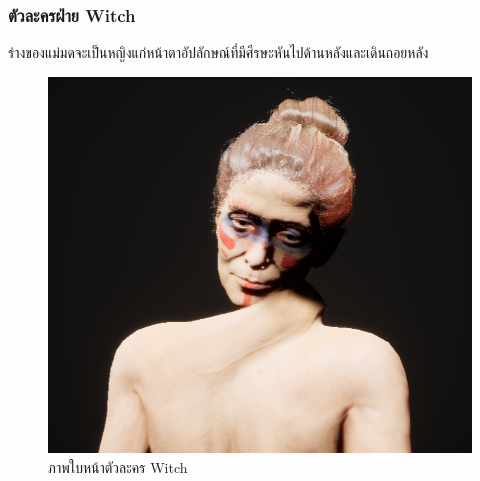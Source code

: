 \subsubsection{ตัวละครฝ่าย Witch}

ร่างของแม่มดจะเป็นหญิงแก่หน้าตาอัปลักษณ์ที่มีศีรษะหันไปด้านหลังและเดินถอยหลัง

\begin{figure}
  \centering
  \begin{subcaptionblock}{.4\textwidth}
    \centering
    \includegraphics[width=.8\linewidth]{./img/characters/witch_face.png}
    \caption{ภาพใบหน้าตัวละคร Witch}\label{ภาพใบหน้าตัวละคร Witch}
  \end{subcaptionblock}%
  \begin{subcaptionblock}{.4\textwidth}
    \centering

\end{subcaptionblock}
\end{figure}
